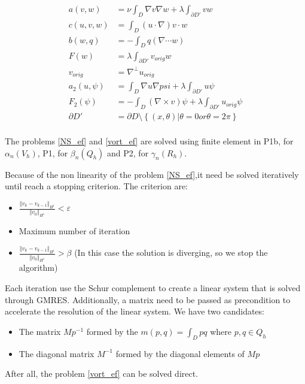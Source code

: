 \begin{align*}
a(v,w) &= \nu \int_D {\nabla v \nabla w} + \lambda  \int_{\partial D'}{vw} \\
c(u,v,w) &= \int_D  {(u\cdot\nabla)v\cdot w} \\
b(w,q) &=  -\int_D {q(\nabla\cdots w)} \\
F(w) &=  \lambda \int_{\partial D'}{v_{orig}w} \\
v_{orig} &= \nabla^\bot u_{orig} \\
a_2(u,\psi) &= \int_D {\nabla u \nabla psi} + \lambda  \int_{\partial D'}{u\psi} \\
F_2(\psi) &= -\int_D {(\nabla\times v)\psi}  + \lambda \int_{\partial D'}{u_{orig}\psi} \\
\partial D' &= \partial D\setminus\left\lbrace(x,\theta)|\theta = 0 or \theta = 2\pi\right\rbrace  \\
\end{align*}

The problems \eqref{NS_ef} and \eqref{vort_ef} are solved using finite element in P1b, for $\alpha_n (V_h)$,  P1, for $\beta_n (Q_h)$ and P2, for $\gamma_n (R_h)$.

Because of the non linearity of the problem \eqref{NS_ef},it need be solved iteratively until reach a stopping criterion. The criterion are:
\begin{itemize}
\item $  \frac{{\Vert v_k-v_{k-1}\Vert}_{H^1}}{{\Vert v_0\Vert}_{H^1}} < \varepsilon$ 
\item Maximum number of iteration
\item $  \frac{{\Vert v_k-v_{k-1}\Vert}_{H^1}}{{\Vert v_0\Vert}_{H^1}} > \beta$ (In this case the solution is diverging, so we stop the algorithm)
\end{itemize}

Each iteration use the Schur complement to create a linear system that is solved through GMRES. Additionally, a matrix need to be passed as precondition to accelerate the resolution of the linear system. We have two candidates:
\begin{itemize}
\item The matrix $Mp^{-1}$ formed by the $m(p,q)=\int_D {pq}$ where $p,q \in Q_h$
\item The diagonal matrix $M^{-1}$ formed by the diagonal elements of $Mp$
\end{itemize}

After all, the problem \eqref{vort_ef} can be solved direct.

